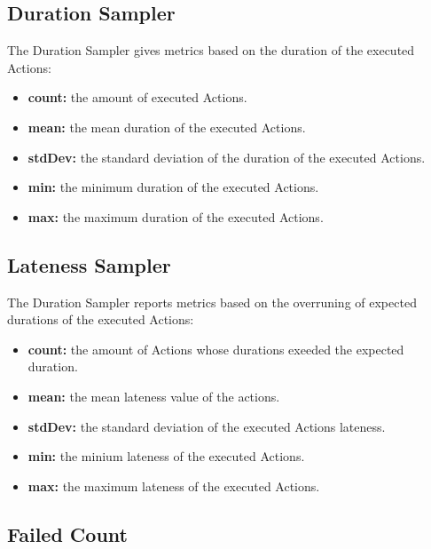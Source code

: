 \subsection{Duration Sampler}
The Duration Sampler gives metrics based on the duration of the executed Actions:
\begin{itemize}
	\item \textbf{count:} the amount of executed Actions.
	\item \textbf{mean:} the mean duration of the executed Actions.
	\item \textbf{stdDev:} the standard deviation of the duration of the executed Actions.
	\item \textbf{min:} the minimum duration of the executed Actions.
	\item \textbf{max:} the maximum duration of the executed Actions.
\end{itemize}
\subsection{Lateness Sampler}
The Duration Sampler reports metrics based on the overruning of expected durations of the executed Actions:
\begin{itemize}
	\item \textbf{count:} the amount of Actions whose durations exeeded the expected duration.
	\item \textbf{mean:} the mean lateness value of the actions.
	\item \textbf{stdDev:} the standard deviation of the executed Actions lateness.
	\item \textbf{min:} the minium lateness of the executed Actions.
	\item \textbf{max:} the maximum lateness of the executed Actions.
\end{itemize}

\subsection{Failed Count}

